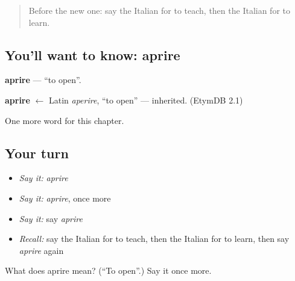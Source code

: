 \begin{quote}
Before the new one: say the Italian for to teach, then the Italian for to learn.
\end{quote}

\subsection*{You'll want to know: aprire}
\textbf{aprire} — \textquotedblleft{}to open\textquotedblright{}.

\begin{cousinweb}
\textbf{aprire} $\leftarrow$ Latin \emph{aperire}, \textquotedblleft{}to open\textquotedblright{} — inherited. (EtymDB 2.1)
\end{cousinweb}

\begin{grammarlens}[title={What you've built}]
One more word for this chapter.
\end{grammarlens}

\subsection*{Your turn}
\begin{itemize}
\raggedright
  \item \emph{Say it:} \emph{aprire}
  \item \emph{Say it:} \emph{aprire}, once more
  \item \emph{Say it:} say \emph{aprire}
  \item \emph{Recall:} say the Italian for to teach, then the Italian for to learn, then say \emph{aprire} again
\end{itemize}

\begin{tcolorbox}[breakable,colback=teal!4,colframe=teal!35!black,title={Before you move on}]
What does aprire mean? (\textquotedblleft{}To open\textquotedblright{}.) Say it once more.
\end{tcolorbox}
